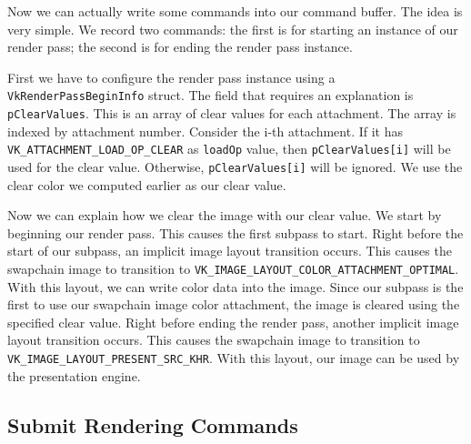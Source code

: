 Now we can actually write some commands into our command buffer.
The idea is very simple.
We record two commands: the first is for starting an instance of our render pass;
the second is for ending the render pass instance.

\begin{minipage}{\linewidth}{\noindent}
    
\end{minipage}

First we have to configure the render pass instance using a \texttt{VkRenderPassBeginInfo}
struct.
The field that requires an explanation is \texttt{pClearValues}.
This is an array of clear values for each attachment.
The array is indexed by attachment number.
Consider the i-th attachment.
If it has \texttt{VK\_ATTACHMENT\_LOAD\_OP\_CLEAR}
as \texttt{loadOp} value, then \texttt{pClearValues[i]} will be used for the
clear value.
Otherwise, \texttt{pClearValues[i]} will be ignored.
We use the clear color we computed earlier as our clear value.

\begin{minipage}{\linewidth}{\noindent}
    
\end{minipage}

Now we can explain how we clear the image with our clear value.
We start by beginning our render pass.
This causes the first subpass to start.
Right before the start of our subpass, an implicit image layout transition occurs.
This causes the swapchain image to transition to
\texttt{VK\_IMAGE\_LAYOUT\_COLOR\_ATTACHMENT\_OPTIMAL}.
With this layout, we can write color data into the image.
Since our subpass is the first to use our swapchain image color attachment, the image
is cleared using the specified clear value.
Right before ending the render pass, another implicit image layout transition occurs.
This causes the swapchain image to transition to
\texttt{VK\_IMAGE\_LAYOUT\_PRESENT\_SRC\_KHR}.
With this layout, our image can be used by the presentation engine.

\subsection{Submit Rendering Commands}

